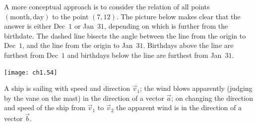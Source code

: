\begin{exercises}
\begin{answer}
\begin{exparts}
          A more conceptual approach is to consider the relation of all points 
          $(\text{month},\text{day})$ to the point $(7,12)$.
          The picture below
          makes clear that the answer is either Dec~$1$ or Jan~$31$, depending
          on which is further from the birthdate. 
          The dashed line bisects the angle between the line from the
          origin to Dec~$1$, and the line from the origin to Jan~$31$.
          Birthdays above the line are furthest from Dec~$1$ and 
          birthdays below the line are furthest from Jan~$31$.
          \begin{center}
            \texttt{[image: ch1.54]}
          \end{center}
      \end{exparts}
    \end{answer}
  \puzzle \item 
    A ship is sailing with speed and direction \( \vec{v}_1 \); the wind blows
    apparently (judging by the vane on the mast) in the direction of a vector
    \( \vec{a} \); on changing the direction and speed of the ship from
    \( \vec{v}_1 \) to \( \vec{v}_2 \) the apparent wind is in the direction
    of a vector \( \vec{b} \).


\end{exercises}
